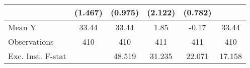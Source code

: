 {\begin{tabular}{l*{5}{c}}
            &     (1.467)         &     (0.975)         &     (2.122)         &     (0.782)         &                     \\
\midrule
Mean Y      &       33.44         &       33.44         &        1.85         &       -0.17         &       33.44         \\
Observations&         410         &         410         &         411         &         411         &         410         \\
Exc. Inst. F-stat&                     &      48.519         &      31.235         &      22.071         &      17.158         \\
\bottomrule
\end{tabular}
}
